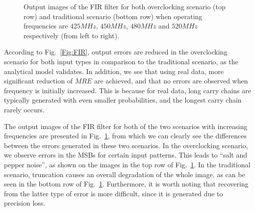 \documentclass[prodmode,acmtrets]{acmsmall} %
\begin{document}
\begin{figure}[ht]
{  }%
\vspace{-2ex}
\caption{Output images of the FIR filter for both overclocking scenario (top row) and traditional scenario (bottom row) when operating frequencies are $425MHz$, $450MHz$, $480MHz$ and $520MHz$ respectively (from left to right).}
\label{Fig:FIR_Lena}
\vspace{-1.5ex}
\end{figure}

According to Fig.~\ref{Fig:FIR}, output errors are reduced in the overclocking scenario for both input types in comparison to the traditional scenario, as the analytical model validates. In addition, we see that using real data, more significant reduction of $MRE$ are achieved, and that no errors are observed when frequency is initially increased. This is because for real data, long carry chains are typically generated with even smaller probabilities, and the longest carry chain rarely occurs.

The output images of the FIR filter for both of the two scenarios with increasing frequencies are presented in Fig.~\ref{Fig:FIR_Lena}, from which we can clearly see the differences between the errors generated in these two scenarios. In the overclocking scenario, we observe errors in the MSBs for certain input patterns. This leads to ``salt and pepper noise'', as shown on the images in the top row of Fig.~\ref{Fig:FIR_Lena}. In the traditional scenario, truncation causes an overall degradation of the whole image, as can be seen in the bottom row of Fig.~\ref{Fig:FIR_Lena}. Furthermore, it is worth noting that recovering from the latter type of error is more difficult, since it is generated due to precision loss.
\end{document}
